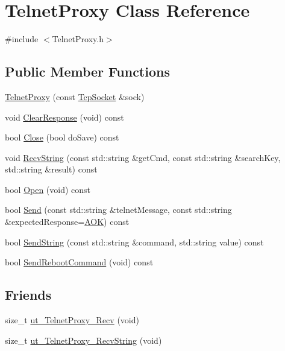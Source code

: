 \hypertarget{class_telnet_proxy}{\section{Telnet\-Proxy Class Reference}
\label{class_telnet_proxy}
}


{\ttfamily \#include $<$Telnet\-Proxy.\-h$>$}

\subsection*{Public Member Functions}
\begin{DoxyCompactItemize}
\item 
\hyperlink{class_telnet_proxy_aa7f9a2c3dffc0c3b7a2cb6f8e96a4645}{Telnet\-Proxy} (const \hyperlink{class_tcp_socket}{Tcp\-Socket} \&sock)
\item 
void \hyperlink{class_telnet_proxy_a72cd6c477bcfc9a578ae3357f70ac1e5}{Clear\-Response} (void) const 
\item 
bool \hyperlink{class_telnet_proxy_ac06a0c97982e5c948f44eb1cabacf5c8}{Close} (bool do\-Save) const 
\item 
void \hyperlink{class_telnet_proxy_a9f167bcd354e53ab8fb959472415762b}{Recv\-String} (const std\-::string \&get\-Cmd, const std\-::string \&search\-Key, std\-::string \&result) const 
\item 
bool \hyperlink{class_telnet_proxy_a4b7729ca11f4ef533d3015b0a53974e6}{Open} (void) const 
\item 
bool \hyperlink{class_telnet_proxy_a3a00f8fc67d35112929ca9e664c3197a}{Send} (const std\-::string \&telnet\-Message, const std\-::string \&expected\-Response=\hyperlink{_telnet_proxy_8h_a2139cfcd9b3c7af8c0246e72ca4ae807}{A\-O\-K}) const 
\item 
bool \hyperlink{class_telnet_proxy_aa9ea9a5af4c1f58f2cc8c6edfa1501ae}{Send\-String} (const std\-::string \&command, std\-::string value) const 
\item 
bool \hyperlink{class_telnet_proxy_a1739a7efe7777a766a39af07664b7c6b}{Send\-Reboot\-Command} (void) const 
\end{DoxyCompactItemize}
\subsection*{Friends}
\begin{DoxyCompactItemize}
\item 
size\-\_\-t \hyperlink{class_telnet_proxy_a436d76cf48d888700dddd5dc72c7bc56}{ut\-\_\-\-Telnet\-Proxy\-\_\-\-Recv} (void)
\item 
size\-\_\-t \hyperlink{class_telnet_proxy_a899fd61cba9dec179f6a058b25c73cb7}{ut\-\_\-\-Telnet\-Proxy\-\_\-\-Recv\-String} (void)
\end{DoxyCompactItemize}


